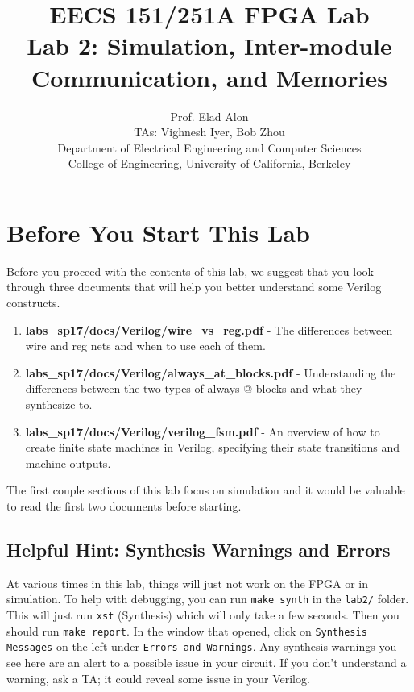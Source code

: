 \documentclass[11pt]{article}
\begin{document}
\title{EECS 151/251A FPGA Lab\\
Lab 2: Simulation, Inter-module Communication, and Memories}

\author{Prof. Elad Alon \\
TAs: Vighnesh Iyer, Bob Zhou \\Department of Electrical Engineering and Computer Sciences\\
College of Engineering, University of California, Berkeley}
\date{}
\maketitle

\section{Before You Start This Lab}

Before you proceed with the contents of this lab, we suggest that you look through three documents that will help you better understand some Verilog constructs.

\begin{enumerate}
	\item \textbf{labs\_sp17/docs/Verilog/wire\_vs\_reg.pdf} - The differences between wire and reg nets and when to use each of them.
	
	\item \textbf{labs\_sp17/docs/Verilog/always\_at\_blocks.pdf} - Understanding the differences between the two types of always @ blocks and what they synthesize to.
	
	\item \textbf{labs\_sp17/docs/Verilog/verilog\_fsm.pdf} - An overview of how to create finite state machines in Verilog, specifying their state transitions and machine outputs.

\end{enumerate}

The first couple sections of this lab focus on simulation and it would be valuable to read the first two documents before starting.

\subsection{Helpful Hint: Synthesis Warnings and Errors}
At various times in this lab, things will just not work on the FPGA or in simulation. To help with debugging, you can run \verb|make synth| in the \verb|lab2/| folder. This will just run \verb|xst| (Synthesis) which will only take a few seconds. Then you should run \verb|make report|. In the window that opened, click on \verb|Synthesis Messages| on the left under \verb|Errors and Warnings|. Any synthesis warnings you see here are an alert to a possible issue in your circuit. If you don't understand a warning, ask a TA; it could reveal some issue in your Verilog.
\end{document}
